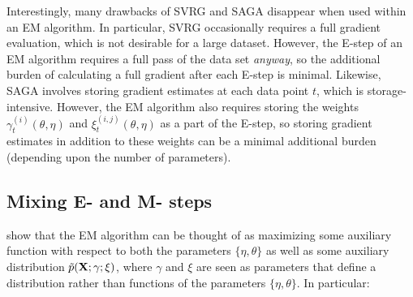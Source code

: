 
Interestingly, many drawbacks of SVRG and SAGA disappear when used within an EM algorithm. In particular, SVRG occasionally requires a full gradient evaluation, which is not desirable for a large dataset. However, the E-step of an EM algorithm requires a full pass of the data set \textit{anyway}, so the additional burden of calculating a full gradient after each E-step is minimal. Likewise, SAGA involves storing gradient estimates at each data point $t$, which is storage-intensive. However, the EM algorithm also requires storing the weights $\gamma_t^{(i)}(\theta, \eta)$ and $\xi_t^{(i,j)}(\theta, \eta)$ as a part of the E-step, so storing gradient estimates in addition to these weights can be a minimal additional burden (depending upon the number of parameters).



\subsection{Mixing E- and M- steps}

\citet{Neal:1998} show that the EM algorithm can be thought of as maximizing some auxiliary function with respect to both the parameters $\{\eta,\theta\}$ as well as some auxiliary distribution $\tilde p (\bf X; \gamma;\xi)$, where $\gamma$ and $\xi$ are seen as parameters that define a distribution rather than functions of the parameters $\{\eta,\theta\}$. In particular:

